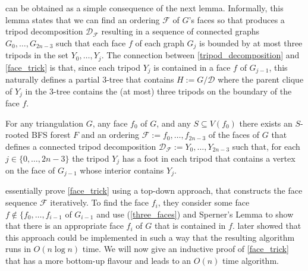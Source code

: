 \documentclass{patmorin}
\begin{document}
 can be obtained as a simple consequence of the next lemma. Informally, this lemma states that we can find an ordering $\mathcal{F}$ of $G$'s faces so that produces a tripod decomposition $\mathcal{D}_\mathcal{F}$ resulting in a sequence of connected graphs $G_0,\ldots,G_{2n-3}$ such that each face $f$ of each graph $G_j$ is bounded by at most three tripods in the set $Y_0,\ldots,Y_j$.  The connection between \cref{tripod_decomposition} and \cref{face_trick} is that, since each tripod $Y_j$ is contained in a face $f$ of $G_{j-1}$, this naturally defines a partial $3$-tree that contains $H:=G/\mathcal{D}$ where the parent clique of $Y_j$ in the $3$-tree contains the (at most) three tripods on the boundary of the face $f$.

\begin{lem}\label{face_trick}
  For any triangulation $G$, any face $f_0$ of $G$, and any $S\subseteq V(f_0)$ there exists an $S$-rooted BFS forest $F$ and an ordering $\mathcal{F}:=f_0,\ldots,f_{2n-3}$ of the faces of $G$ that defines a connected tripod decomposition $\mathcal{D}_\mathcal{F}:=Y_0,\ldots,Y_{2n-3}$ such that, for each $j\in\{0,\ldots,2n-3\}$ the tripod $Y_j$ has a foot in each tripod that contains a vertex on the face of $G_{j-1}$ whose interior  contains $Y_j$.
\end{lem}

\citet{dujmovic.joret.ea:planar} essentially prove \cref{face_trick} using a top-down approach, that constructs the face sequence $\mathcal{F}$ iteratively.  To find the face $f_i$, they consider some face $f\not\in\{f_0,\ldots,f_{i-1}$ of $G_{i-1}$ and use (\ref{three_faces}) and Sperner's Lemma to show that there is an appropriate face $f_i$ of $G$ that is contained in $f$.  \citet{morin:fast} later showed that this approach could be implemented in such a way that the resulting algorithm runs in $O(n\log n)$ time.  We will now give an inductive proof of \cref{face_trick} that has a more bottom-up flavour and leads to an $O(n)$ time algorithm.
\end{document}
